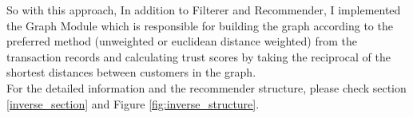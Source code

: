 So with this approach, In addition to Filterer and Recommender, I implemented the Graph Module which is responsible for building the graph according to the preferred method (unweighted or euclidean distance weighted) from the transaction records and calculating trust scores by taking the reciprocal of the shortest distances between customers in the graph. \\

For the detailed information and the recommender structure, please check section \ref{inverse_section} and Figure \ref{fig:inverse_structure}.